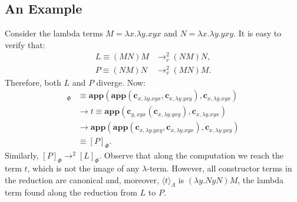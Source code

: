\documentclass{LMCS}
\newcommand{\varone}{x}
\newcommand{\vartwo}{y}
\newcommand{\lambdaone}{M}
\newcommand{\lambdatwo}{N}
\newcommand{\lambdathree}{L}
\newcommand{\lambdafour}{P}
\newcommand{\termone}{t}
\newcommand{\appTRS}{\mathbf{app}}
\newcommand{\constr}[2]{\mathbf{c}_{#1,#2}}
\newcommand{\LambdatoTRS}[1]{[#1]_{\Phi}}
\newcommand{\TRStolambda}[1]{\langle{#1}\rangle_{\Lambdaterms}}
\newcommand{\Lambdaterms}{\Lambda}
\newcommand{\rewrTRS}{\rightarrow}
\newcommand{\rewrlambdav}{\rightarrow_v}
\begin{document}
\subsection{An Example}
Consider the lambda terms $\lambdaone=\lambda\varone.\lambda\vartwo.\varone\vartwo\varone$
and $\lambdatwo=\lambda\varone.\lambda\vartwo.\vartwo\varone\vartwo$. It is easy to
verify that:
\begin{align*}
\lambdathree\equiv(\lambdaone\lambdatwo)\lambdaone&\rewrlambdav^2(\lambdatwo\lambdaone)\lambdatwo,\\
\lambdafour\equiv(\lambdatwo\lambdaone)\lambdatwo&\rewrlambdav^2(\lambdaone\lambdatwo)\lambdaone.
\end{align*}
Therefore, both $\lambdathree$ and $\lambdafour$ diverge. Now:
\begin{align*}
\LambdatoTRS{\lambdathree}&\equiv\appTRS(\appTRS(\constr{\varone}{\lambda\vartwo.\varone\vartwo\varone},
   \constr{\varone}{\lambda\vartwo.\vartwo\varone\vartwo}),\constr{\varone}{\lambda\vartwo.\varone\vartwo\varone})\\
   &\rewrTRS\termone\equiv\appTRS(\constr{\vartwo}{\varone\vartwo\varone}(\constr{\varone}{\lambda\vartwo.\vartwo\varone\vartwo}),
   \constr{\varone}{\lambda\vartwo.\varone\vartwo\varone})\\
   &\rewrTRS\appTRS(\appTRS(\constr{\varone}{\lambda\vartwo.\vartwo\varone\vartwo},
   \constr{\varone}{\lambda\vartwo.\varone\vartwo\varone}),\constr{\varone}{\lambda\vartwo.\vartwo\varone\vartwo})\\
   &\equiv\LambdatoTRS{\lambdafour}.
\end{align*}
Similarly, $\LambdatoTRS{\lambdafour}\rewrTRS^2\LambdatoTRS{\lambdathree}$. Observe
that along the computation we reach the term $\termone$, which is not the image of any $\lambda$-term. However, all constructor terms in the reduction are canonical and, moreover,
$\TRStolambda{\termone}$ is $(\lambda\vartwo.\lambdatwo\vartwo\lambdatwo)\lambdaone$, 
the lambda term found along the reduction from $\lambdathree$ to $\lambdafour$.
\end{document}
